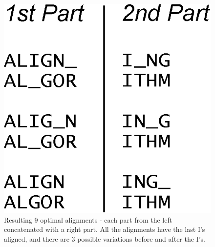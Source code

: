 \begin{figure}[htb!]
\begin{minipage}{0.48\linewidth}
	\includegraphics[scale=0.5]{img-align/alignments.eps}
	\caption[Resulting optimal alignments from Edit Distance]{Resulting 9 optimal alignments - each part from the left concatenated with a right part. All the alignments have the last I's aligned, and there are 3 possible variations before and after the I's.}
	\label{alignments}
  \end{minipage}
\end{figure} 






